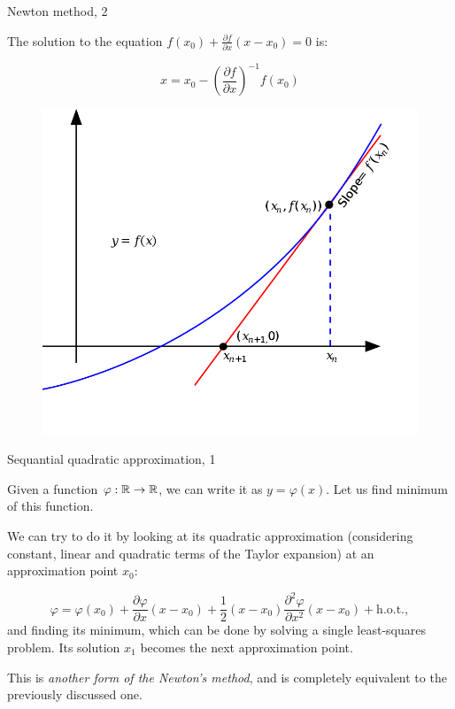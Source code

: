 \documentclass{beamer}
\begin{document}
\begin{frame}{Newton method, 2}
	\begin{flushleft}
		
		The solution to the equation $f(x_0) + \frac{\partial f}{\partial x} (x - x_0) = 0$ is:
		
		\begin{equation}
			x = x_0  - \left ( \frac{\partial f}{\partial x} \right )^{-1} f(x_0)
		\end{equation}
		
		\begin{figure}
			\centering
			\includegraphics[width=0.6\linewidth]{Newton_iteration}
			\label{fig:newtoniteration}
		\end{figure}
		
		
	\end{flushleft}
\end{frame}



\begin{frame}{Sequantial quadratic approximation, 1}
	\begin{flushleft}
		
		Given a function $\varphi: \mathbb{R} \rightarrow \mathbb{R}$, we can write it as $y = \varphi(x)$. Let us find minimum of this function.
		
		\bigskip
		
		We can try to do it by looking at its quadratic approximation (considering constant, linear and quadratic terms of the Taylor expansion) at an approximation point $x_0$:
		
		\begin{equation}
			\varphi = \varphi(x_0) + \frac{\partial \varphi}{\partial x} (x - x_0)
			+ \frac{1}{2} (x - x_0) \frac{\partial^2 \varphi}{\partial x^2} (x - x_0)
			 + \text{h.o.t.},
		\end{equation}
		and finding its minimum, which can be done by solving a single least-squares problem. Its solution $x_1$ becomes the next approximation point.
		
		\bigskip
		
		This is \emph{another form of the Newton's method}, and is completely equivalent to the previously discussed one. 
		
		
		
	\end{flushleft}
\end{frame}
\end{document}
